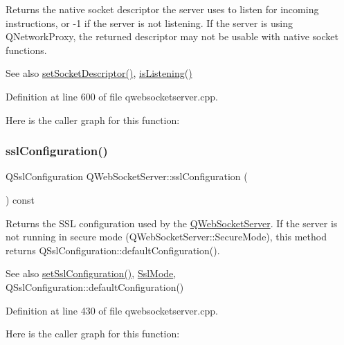 Returns the native socket descriptor the server uses to listen for incoming instructions, or -\/1 if the server is not listening. If the server is using Q\+Network\+Proxy, the returned descriptor may not be usable with native socket functions.

\begin{DoxySeeAlso}{See also}
\mbox{\hyperlink{class_q_web_socket_server_a9a4f765799fe4423be47c54c51a16b20}{set\+Socket\+Descriptor()}}, \mbox{\hyperlink{class_q_web_socket_server_a4505cb4c119bc490f8bf401998c6df43}{is\+Listening()}} 
\end{DoxySeeAlso}


Definition at line 600 of file qwebsocketserver.\+cpp.

Here is the caller graph for this function\+:
\mbox{\label{class_q_web_socket_server_ae1f454fd2ce66388241f8b7acb680ad5}} 
\subsubsection{\texorpdfstring{ssl\+Configuration()}{sslConfiguration()}}
{\footnotesize\ttfamily Q\+Ssl\+Configuration Q\+Web\+Socket\+Server\+::ssl\+Configuration (\begin{DoxyParamCaption}{ }\end{DoxyParamCaption}) const}

Returns the S\+SL configuration used by the \mbox{\hyperlink{class_q_web_socket_server}{Q\+Web\+Socket\+Server}}. If the server is not running in secure mode (Q\+Web\+Socket\+Server\+::\+Secure\+Mode), this method returns Q\+Ssl\+Configuration\+::default\+Configuration().

\begin{DoxySeeAlso}{See also}
\mbox{\hyperlink{class_q_web_socket_server_a543df52afcb224e3bd8c32b02f757de9}{set\+Ssl\+Configuration()}}, \mbox{\hyperlink{class_q_web_socket_server_a07ce392fd4fa351746e48b00428366b8}{Ssl\+Mode}}, Q\+Ssl\+Configuration\+::default\+Configuration() 
\end{DoxySeeAlso}


Definition at line 430 of file qwebsocketserver.\+cpp.

Here is the caller graph for this function\+:
\mbox{\label{class_q_web_socket_server_a53d7949bf17ea46f265cc099e762bffb}} 
